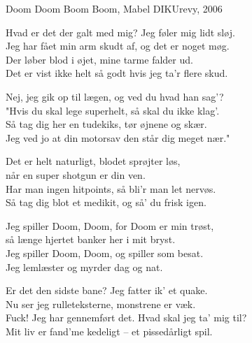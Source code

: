 \begin{song}{Doom Doom}
  {} %
  {Boom Boom, Mabel} %
  {} %
  {DIKUrevy, 2006} %
  {\NotCCLIed} %

  \begin{SBVerse}
    Hvad er det der galt med mig? Jeg føler mig lidt sløj.\\
    Jeg har fået min arm skudt af, og det er noget møg.\\
    Der løber blod i øjet, mine tarme falder ud.\\
    Det er vist ikke helt så godt hvis jeg ta'r flere skud.
  \end{SBVerse}

  \begin{SBVerse}
    Nej, jeg gik op til lægen, og ved du hvad han sag'?\\
    "Hvis du skal lege superhelt, så skal du ikke klag'.\\
    Så tag dig her en tudekiks, tør øjnene og skær.\\
    Jeg ved jo at din motorsav den står dig meget nær."
  \end{SBVerse}

  \begin{SBSection*}
    Det er helt naturligt, blodet sprøjter løs,\\
    når en super shotgun er din ven.\\
    Har man ingen hitpoints, så bli'r man let nervøs.\\
    Så tag dig blot et medikit, og så' du frisk igen.
  \end{SBSection*}

  \begin{SBChorus}
    Jeg spiller Doom, Doom, for Doom er min trøst,\\
    så længe hjertet banker her i mit bryst.\\
    Jeg spiller Doom, Doom, og spiller som besat.\\
    Jeg lemlæster og myrder dag og nat.
  \end{SBChorus}

  \begin{SBVerse}
    Er det den sidste bane? Jeg fatter ik' et quake.\\
    Nu ser jeg rulleteksterne, monstrene er væk.\\
    Fuck! Jeg har gennemført det. Hvad skal jeg ta' mig til?\\
    Mit liv er fand'me kedeligt -- et pissedårligt spil.
  \end{SBVerse}


\end{song}
